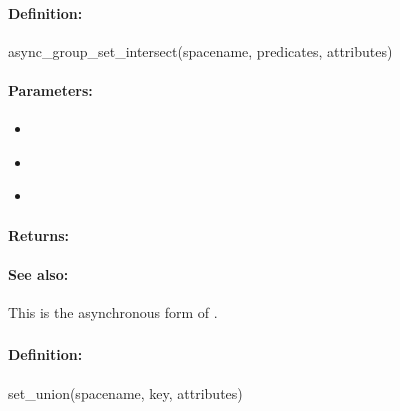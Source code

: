 \paragraph{Definition:}
\begin{rubycode}
async_group_set_intersect(spacename, predicates, attributes)
\end{rubycode}

\paragraph{Parameters:}
\begin{itemize}[noitemsep]
\item {}\\

\item {}\\

\item {}\\

\end{itemize}

\paragraph{Returns:}


\paragraph{See also:}  This is the asynchronous form of .

\pagebreak
\subsubsection{}
\label{api:ruby:set_union}


\paragraph{Definition:}
\begin{rubycode}
set_union(spacename, key, attributes)
\end{rubycode}


